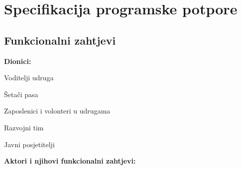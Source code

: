 \chapter{Specifikacija programske potpore}
	
\section{Funkcionalni zahtjevi}
		

		
		\noindent \textbf{Dionici:}
		
		\begin{packed_enum}
			
			\item Voditelji udruga
			\item Šetači pasa			
			\item Zaposlenici i volonteri u udrugama
			\item Razvojni tim
			\item Javni posjetitelji
			
		\end{packed_enum}
		\vspace{5mm}
		
		\noindent \textbf{Aktori i njihovi funkcionalni zahtjevi:}
		
